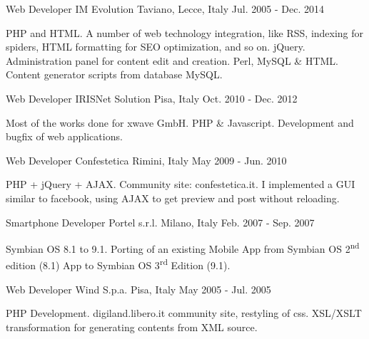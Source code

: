 \begin{cventries}
  \cventry
    {Web Developer}
    {IM Evolution}
    {Taviano, Lecce, Italy}
    {Jul. 2005 - Dec. 2014} %
    {
      \begin{cvitems}
        {PHP and HTML. A number of web technology integration, like RSS, indexing for spiders, HTML formatting for SEO optimization, and so on.}
        {jQuery. Administration panel for content edit and creation.}
        {Perl, MySQL \& HTML. Content generator scripts from database MySQL.}
      \end{cvitems}
    }

  \cventry
    {Web Developer}
    {IRISNet Solution}
    {Pisa, Italy}
    {Oct. 2010 - Dec. 2012} %
    {
      \begin{cvitems}
        {Most of the works done for xwave GmbH.}
        {PHP \& Javascript. Development and bugfix of web applications.}
      \end{cvitems}
    }

  \cventry
    {Web Developer}
    {Confestetica}
    {Rimini, Italy}
    {May 2009 - Jun. 2010} %
    {
      \begin{cvitems}
        {PHP + jQuery + AJAX. Community site: confestetica.it. I implemented a GUI similar to facebook, using AJAX to get preview and post without reloading.}
      \end{cvitems}
    }

  \cventry
    {Smartphone Developer}
    {Portel s.r.l.}
    {Milano, Italy}
    {Feb. 2007 - Sep. 2007} %
    {
      \begin{cvitems}
        {Symbian OS 8.1 to 9.1. Porting of an existing Mobile App from Symbian OS 2\textsuperscript{nd} edition (8.1) App to Symbian OS 3\textsuperscript{rd} Edition (9.1).}
      \end{cvitems}
    }

  \cventry
    {Web Developer}
    {Wind S.p.a.}
    {Pisa, Italy}
    {May 2005 - Jul. 2005} %
    {
      \begin{cvitems}
        {PHP Development. digiland.libero.it community site, restyling of css.}
        {XSL/XSLT transformation for generating contents from XML source.}
      \end{cvitems}
    }


\end{cventries}
